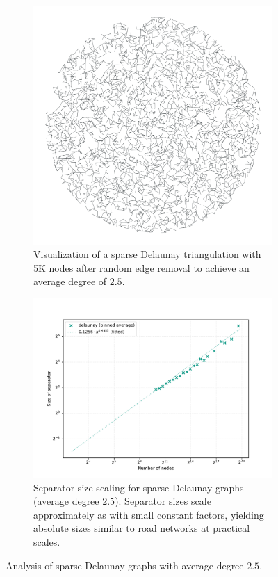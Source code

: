 \begin{figure}
	\centering
	\begin{subfigure}{0.35\linewidth}
		\centering
		\includegraphics[width=\linewidth]{graphics/delaunay_avg_deg.png}
		\caption{Visualization of a sparse Delaunay triangulation with 5K nodes after random edge removal to achieve an average degree of \(2.5\).}
		\label{fig:sparse_delaunay_viz}
	\end{subfigure}
	\hfill
	\begin{subfigure}{0.55\linewidth}
		\centering
		\includegraphics[width=\linewidth]{graphics/sep_delaunay_avg_deg.png}
		\caption{Separator size scaling for sparse Delaunay graphs (average degree \(2.5\)). Separator sizes scale approximately as  with small constant factors, yielding absolute sizes similar to road networks at practical scales.}
		\label{fig:sparse_delaunay_sep_plot}
	\end{subfigure}
	\caption{Analysis of sparse Delaunay graphs with average degree \(2.5\).}
	\label{fig:sparse_delaunay_separators}
\end{figure}

